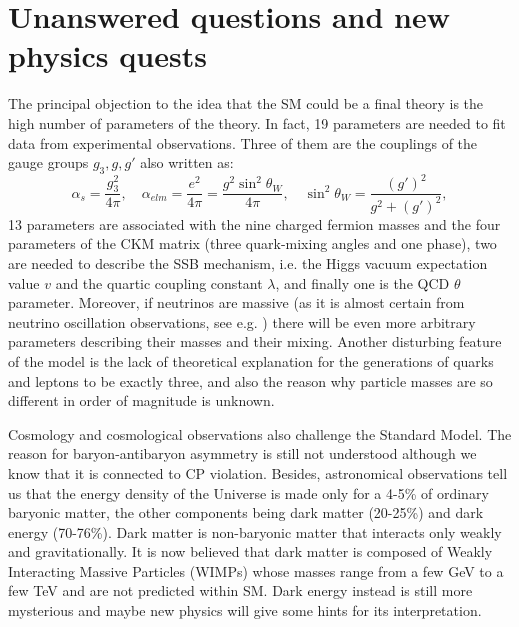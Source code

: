 
\section{Unanswered questions and new physics quests}\label{sec:THquest}

The principal objection to the idea that the SM could be a final theory is the high number of parameters of the theory. In fact, 19 parameters are needed to fit data from experimental observations. 
Three of them  are the couplings of the gauge groups $g_3, g, g'$ also written as: \begin{equation}\label{eq:couplings}
\alpha_{s}=\dfrac{g_{3}^{2}}{4\pi} ,\quad \alpha_{elm} = \dfrac{e^{2}}{4\pi} =  \dfrac{g^{2}\sin^{2}\theta_{W}}{4\pi}, \quad \sin^{2}\theta_{W} = \dfrac{(g')^{2}}{g^{2}+(g')^{2}},
\end{equation}
13 parameters are associated with the nine charged fermion masses and the four parameters of the CKM matrix (three quark-mixing angles and one phase), two are needed to describe the SSB mechanism, i.e. the Higgs vacuum expectation value $v$ and the quartic coupling constant $\lambda$, and  finally one is the QCD $\theta$ parameter. Moreover, if neutrinos are massive (as it is almost certain from neutrino oscillation observations, see e.g. \cite{Langacker:817840}) there will be even more arbitrary parameters describing their masses and their mixing. Another disturbing feature of the model is the lack of theoretical explanation for the generations of quarks and leptons to be exactly three, and also the reason why particle masses are so different in order of magnitude is unknown.

Cosmology and cosmological observations also challenge the Standard Model. The reason for baryon-antibaryon asymmetry is still not understood although we know that it is connected to  CP violation. Besides, astronomical observations tell us that the energy density of the Universe is made only for a 4-5\% of ordinary baryonic matter, the other components being dark matter (20-25\%) and dark energy (70-76\%). Dark matter is non-baryonic matter that interacts only weakly and gravitationally. It is now believed that dark matter is composed  of Weakly Interacting Massive Particles (WIMPs) whose masses range from a few GeV to a few TeV and  are not predicted within SM. Dark energy instead is still more mysterious and maybe new physics will give some hints for its interpretation.

